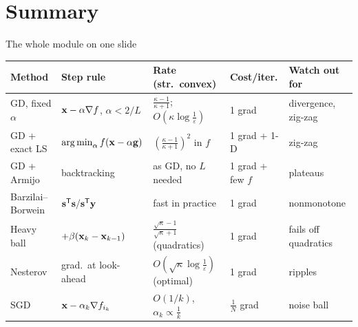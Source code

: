 \section{Summary}

\begin{frame}{The whole module on one slide}
  \centering\footnotesize
  \renewcommand{\arraystretch}{1.45}
  \begin{tabular}{@{}l l l l l@{}}
    \toprule
    Method & Step rule & Rate (str.\ convex) & Cost/iter. & Watch out for \\
    \midrule
    GD, fixed $\alpha$ & $\mathbf{x}-\alpha\nabla f$, $\alpha<2/L$ & $\frac{\kappa-1}{\kappa+1}$; $O(\kappa\log\frac1\varepsilon)$ & 1 grad & divergence, zig-zag \\
    GD + exact LS & $\operatorname*{arg\,min}_\alpha f(\mathbf{x}-\alpha\mathbf{g})$ & $(\frac{\kappa-1}{\kappa+1})^2$ in $f$ & 1 grad + 1-D & zig-zag \\
    GD + Armijo & backtracking & as GD, no $L$ needed & 1 grad + few $f$ & plateaus \\
    Barzilai--Borwein & $\mathbf s^{\mathsf T}\mathbf s/\mathbf s^{\mathsf T}\mathbf{y}$ & fast in practice & 1 grad & nonmonotone \\
    Heavy ball & $+\beta(\mathbf{x}_k-\mathbf{x}_{k-1})$ & $\frac{\sqrt\kappa-1}{\sqrt\kappa+1}$ (quadratics) & 1 grad & fails off quadratics \\
    Nesterov & grad.\ at look-ahead & $O(\sqrt\kappa\log\frac1\varepsilon)$ (optimal) & 1 grad & ripples \\
    SGD & $\mathbf{x}-\alpha_k\nabla f_{i_k}$ & $O(1/k)$, $\alpha_k\propto\frac1k$ & $\frac1N$ grad & noise ball \\
    \bottomrule
  \end{tabular}
\end{frame}


